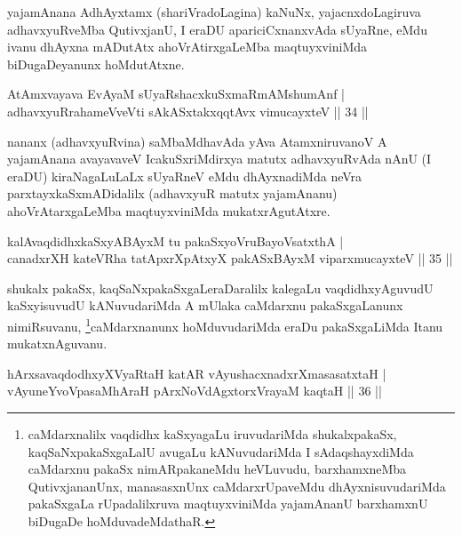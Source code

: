 \begin{artha}
yajamAnana AdhAyxtamx (shariVradoLagina) kaNuNx, yajacnxdoLagiruva adhavxyuR\-veMba QutivxjanU, I eraDU apariciCxnanxvAda sUyaRne, eMdu ivanu dhAyxna mADutAtx ahoVrAtirxgaLeMba maqtuyxviniMda biDugaDeyanunx hoMdutAtxne.
\end{artha}


\begin{shl}
AtAmxvayava EvAyaM sUyaRshacxkuSxmaRmAMshumAnf |\\
adhavxyuRrahameVveVti sAkASxtakxqqtAvx vimucayxteV \hfill || 34 ||
\end{shl}

\begin{artha}
nananx (adhavxyuRvina) saMbaMdhavAda yAva AtamxniruvanoV A yajamAnana avayavaveV IcakuSxriMdirxya matutx adhavxyuRvAda nAnU (I eraDU) kiraNagaLuLaLx sUyaRneV eMdu dhAyxnadiMda neVra parxtayxkaSxmADidalilx (adhavxyuR matutx yajamAnanu) ahoVrAtarxgaLeMba maqtuyxviniMda mukatxrAgutAtxre.
\end{artha}


\begin{shl}
kalAvaqdidhxkaSxyABAyxM tu pakaSxyoVruBayoVsatxthA |\\
canadxrXH kateVRha tatApxrXpAtxyX pakASxBAyxM viparxmucayxteV \hfill || 35 ||
\end{shl}

\begin{artha}
shukalx pakaSx, kaqSaNxpakaSxgaLeraDaralilx kalegaLu vaqdidhxyAguvudU kaSxyisuvudU kANuvudariMda A mUlaka caMdarxnu pakaSxgaLanunx nimiRsuvanu, \footnote[1]{caMdarxnalilx vaqdidhx kaSxyagaLu iruvudariMda shukalxpakaSx, kaqSaNxpakaSxgaLalU avugaLu kANuvudariMda I sAdaqshayxdiMda caMdarxnu pakaSx nimARpakaneMdu heVLuvudu, barxhamxneMba QutivxjananUnx, manasasxnUnx caMdarxrUpaveMdu dhAyxnisuvudariMda pakaSxgaLa rUpadalilxruva maqtuyxviniMda yajamAnanU barxhamxnU biDugaDe hoMduvadeMdathaR.}caMdarxnanunx hoMduvudariMda eraDu pakaSxgaLiMda Itanu mukatxnAguvanu.
\end{artha}


\begin{shl}
hArxsavaqdodhxyXVyaRtaH katAR vAyushacxnadxrXmasasatxtaH |\\
vAyuneYvoVpasaMhAraH pArxNoVdAgxtorxVrayaM kaqtaH \hfill || 36 ||
\end{shl}

